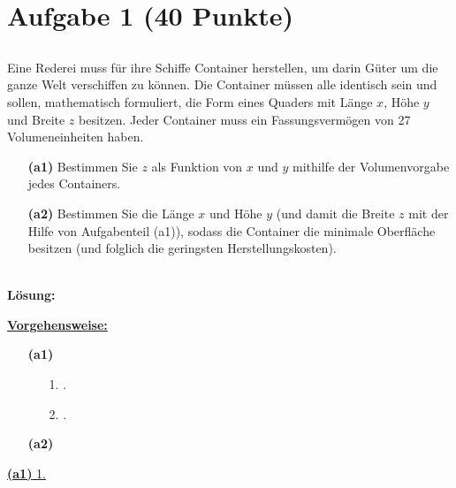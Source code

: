 \vspace{1cm}
\renewcommand{\labelenumi}{\theenumi.}
\section*{Aufgabe 1 (40 Punkte)}
\vspace{0.4cm}
\subsection*{}
Eine Rederei muss für ihre Schiffe Container herstellen, um darin Güter um die ganze Welt verschiffen zu können. Die Container müssen alle identisch sein und sollen, mathematisch formuliert, die Form eines Quaders  mit Länge $ x $, Höhe $ y $ und Breite $ z $ besitzen. Jeder Container muss ein Fassungsvermögen von 27 Volumeneinheiten haben. 
\begin{enumerate}
	\item[\textbf{(a1)}]
	Bestimmen Sie $ z $ als Funktion von $ x $ und $ y $ mithilfe der Volumenvorgabe jedes Containers.
	\item[\textbf{(a2)}] 
	Bestimmen Sie die Länge $ x $ und Höhe $ y $ (und damit die Breite $ z $ mit der Hilfe von Aufgabenteil (a1)), sodass die Container die minimale Oberfläche besitzen (und folglich die geringsten Herstellungskosten).
\end{enumerate}
\ \\
\textbf{Lösung:}
\begin{mdframed}
\underline{\textbf{Vorgehensweise:}}
\renewcommand{\labelenumi}{\theenumi.}
\begin{enumerate}
\item[\textbf{(a1)}] 
\begin{enumerate}
	\item[1.] .
	\item[2.] .
\end{enumerate} 
\item[\textbf{(a2)}] 
\end{enumerate}
\end{mdframed}
\underline{\textbf{(a1)} 1. }\\






\newpage

